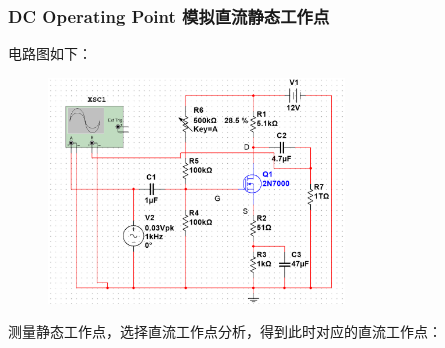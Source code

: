 \documentclass[a4paper,11pt,UTF8]{article}
\numberwithin{equation}{subsection}
\begin{document}
\subsubsection{DC Operating Point 模拟直流静态工作点}
电路图如下：
\begin{figure}[H]
	\centering
	\includegraphics[width=0.7\textwidth]{2.4.PNG}	
\end{figure}
测量静态工作点，选择直流工作点分析，得到此时对应的直流工作点：
\begin{figure}[H]
		\subfigure{
		\centering
		\texttt{[image: Q\_pt]}	
	}

\end{figure}
\end{document}
